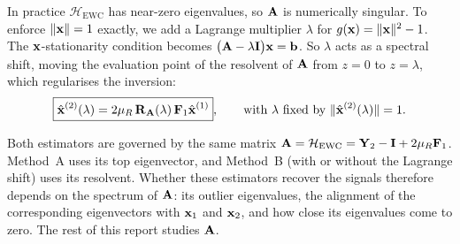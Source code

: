In practice $\mathcal H_{\mathrm{EWC}}$ has near-zero eigenvalues, so $\boldsymbol{\mathbf{A}}$ is numerically singular. To enforce $ \|\boldsymbol{\mathbf{x}} \| = 1$ exactly, we add a Lagrange multiplier $\lambda$ for $g(\boldsymbol{\mathbf{x}}) =  \|\boldsymbol{\mathbf{x}} \|^2 - 1$. The $\boldsymbol{\mathbf{x}}$-stationarity condition becomes $\bigl(\boldsymbol{\mathbf{A}} - \lambda\boldsymbol{\mathbf{I}}\bigr)\boldsymbol{\mathbf{x}} = \boldsymbol{\mathbf{b}}$. So $\lambda$ acts as a spectral shift, moving the evaluation point of the resolvent of $\boldsymbol{\mathbf{A}}$ from $z=0$ to $z=\lambda$, which regularises the inversion:
\begin{equation}
    \boxed{\hat{\boldsymbol{\mathbf{x}}}^{(2)}(\lambda) = 2\mu_R\,\boldsymbol{\mathbf{R}}_{\boldsymbol{\mathbf{A}}}(\lambda)\,\boldsymbol{\mathbf{F}}_1 \hat{\boldsymbol{\mathbf{x}}}^{(1)}},
    \qquad \text{with $\lambda$ fixed by }  \|\hat{\boldsymbol{\mathbf{x}}}^{(2)}(\lambda) \| = 1.
    \label{eq:final_estimator_lagrange}
\end{equation}

\noindent
Both estimators are governed by the same matrix $\boldsymbol{\mathbf{A}} = \mathcal H_{\mathrm{EWC}} = \boldsymbol{\mathbf{Y}}_2 - \boldsymbol{\mathbf{I}} + 2\mu_R\boldsymbol{\mathbf{F}}_1$. Method~A uses its top eigenvector, and Method~B (with or without the Lagrange shift) uses its resolvent. Whether these estimators recover the signals therefore depends on the spectrum of $\boldsymbol{\mathbf{A}}$: its outlier eigenvalues, the alignment of the corresponding eigenvectors with $\boldsymbol{\mathbf{x}}_1$ and $\boldsymbol{\mathbf{x}}_2$, and how close its eigenvalues come to zero. The rest of this report studies $\boldsymbol{\mathbf{A}}$.\\


